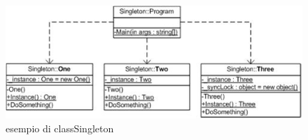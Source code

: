 \documentclass[a4paper,10pt]{article}
\begin{document}
                \begin{figure}[h!] %
                    \centering
                    \includegraphics[scale=0.90]{img/IC20518}	
                    \caption{esempio di classSingleton}
                \end{figure}
        
                \newpage
\end{document}
